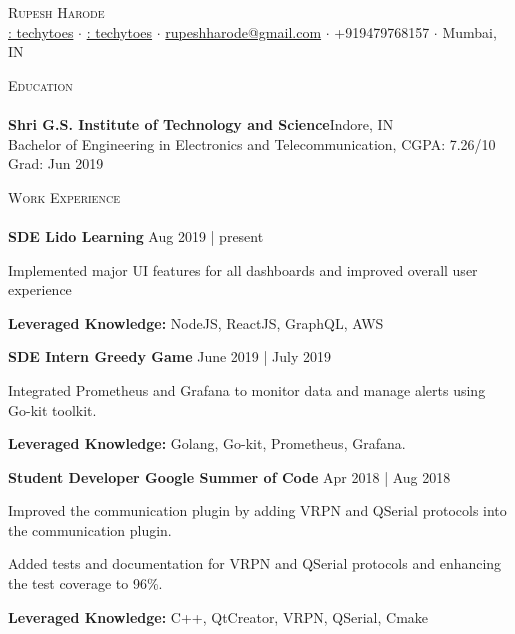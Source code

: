 \documentclass[a4paper]{article}
\newcommand{\lineunder} {
    \vspace*{-8pt} \\
    \hspace*{-18pt} \hrulefill \\
}
\newcommand{\header} [1] {
    {\hspace*{-18pt}\vspace*{6pt} \textsc{#1}}
    \vspace*{-6pt} \lineunder
}
\begin{document}
\vspace*{-40pt}

\vspace*{-10pt}
\begin{center}
	{\Huge \scshape {Rupesh Harode}}\\
	{\faLinkedin \href{https://www.linkedin.com/in/techytoes/}{: techytoes}}
	$\cdot$
	{\faGithub \href{https://github.com/techytoes}{ : techytoes}}
	$\cdot$
	\href{mailto:rupeshharode@gmail.com}{rupeshharode@gmail.com} $\cdot$ +919479768157 $\cdot$ Mumbai, IN \\
\end{center}
\vspace*{1mm}
\header{Education}
\textbf{Shri G.S. Institute of Technology and Science}\hfill Indore, IN\\
Bachelor of Engineering in Electronics and Telecommunication, CGPA: 7.26/10 \hfill Grad: Jun 2019\\
\vspace*{1mm}
\header{Work Experience}
\textbf{SDE  \hfill Lido Learning} \hfill Aug 2019 | present\\
\vspace{-1mm}
\begin{itemize} \itemsep 1pt
	\small{\item Implemented major UI features for all dashboards and improved overall user experience}
	\small{\item \textbf{Leveraged Knowledge:} NodeJS, ReactJS, GraphQL, AWS}
\end{itemize}

\textbf{SDE Intern  \hfill Greedy Game} \hfill June 2019 | July 2019\\
\vspace{-1mm}
\begin{itemize} \itemsep 1pt
	\small{\item Integrated Prometheus and Grafana to monitor data and manage alerts using Go-kit toolkit.}
	\small{\item \textbf{Leveraged Knowledge:} Golang, Go-kit, Prometheus, Grafana.}
\end{itemize}


\textbf{Student Developer  \hfill Google Summer of Code} \hfill Apr 2018 | Aug 2018\\
\vspace{-1mm}
\begin{itemize} \itemsep 1pt
	\small{\item Improved the communication plugin by adding VRPN and QSerial protocols into the communication plugin.}
	\small{\item  Added tests and documentation for VRPN and QSerial protocols and enhancing the test coverage to 96\%.}
	\small{\item \textbf{Leveraged Knowledge:} C++, QtCreator, VRPN, QSerial, Cmake}
\end{itemize}
\end{document}
